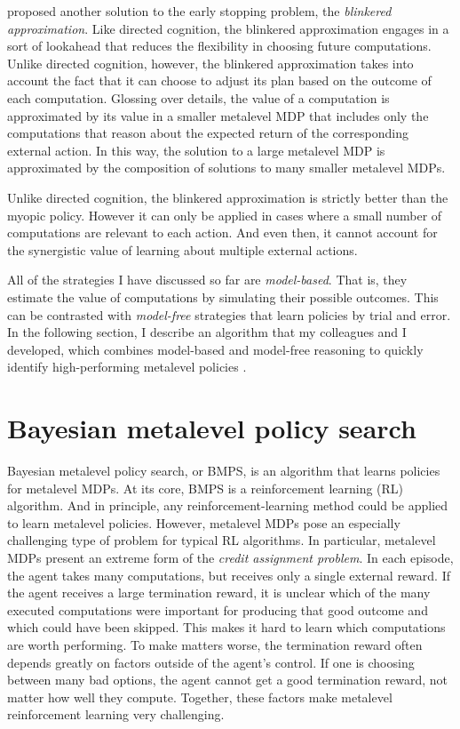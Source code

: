 \citet{hay2012selecting} proposed another solution to the early stopping problem, the \emph{blinkered approximation}. Like directed cognition, the blinkered approximation engages in a sort of lookahead that reduces the flexibility in choosing future computations. Unlike directed cognition, however, the blinkered approximation takes into account the fact that it can choose to adjust its plan based on the outcome of each computation. Glossing over details, the value of a computation is approximated by its value in a smaller metalevel MDP that includes only the computations that reason about the expected return of the corresponding external action. In this way, the solution to a large metalevel MDP is approximated by the composition of solutions to many smaller metalevel MDPs. 

Unlike directed cognition, the blinkered approximation is strictly better than the myopic policy. However it can only be applied in cases where a small number of computations are relevant to each action. And even then, it cannot account for the synergistic value of learning about multiple external actions. 

All of the strategies I have discussed so far are \emph{model-based}. That is, they estimate the value of computations by simulating their possible outcomes. This can be contrasted with \emph{model-free} strategies that learn policies by trial and error. In the following section, I describe an algorithm that my colleagues and I developed, which combines model-based and model-free reasoning to quickly identify high-performing metalevel policies \citep{callaway2018learning}.


\section{Bayesian metalevel policy search}\label{sec:bmps}

Bayesian metalevel policy search, or BMPS, is an algorithm that learns policies for metalevel MDPs. At its core, BMPS is a reinforcement learning (RL) algorithm. And in principle, any reinforcement-learning method could be applied to learn metalevel policies. However, metalevel MDPs pose an especially challenging type of problem for typical RL algorithms. In particular, metalevel MDPs present an extreme form of the \emph{credit assignment problem}. In each episode, the agent takes many computations, but receives only a single external reward. If the agent receives a large termination reward, it is unclear which of the many executed computations were important for producing that good outcome and which could have been skipped. This makes it hard to learn which computations are worth performing. To make matters worse, the termination reward often depends greatly on factors outside of the agent's control. If one is choosing between many bad options, the agent cannot get a good termination reward, not matter how well they compute. Together, these factors make metalevel reinforcement learning very challenging.

